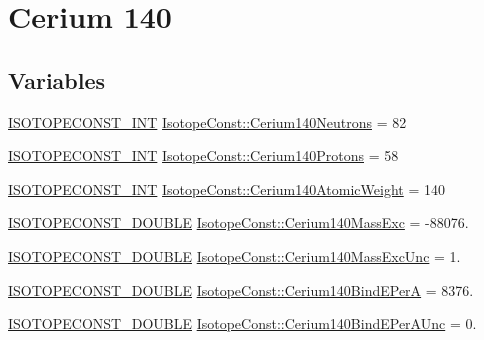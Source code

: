 \hypertarget{group___isotope_const-_cerium-_ce140}{}\section{Cerium 140}
\label{group___isotope_const-_cerium-_ce140}
\subsection*{Variables}
\begin{DoxyCompactItemize}
\item 
\mbox{\hyperlink{group___isotope_const-_macros_ga5f18360b3e99483a35c32d789e62621c}{I\+S\+O\+T\+O\+P\+E\+C\+O\+N\+S\+T\+\_\+\+I\+NT}} \mbox{\hyperlink{group___isotope_const-_cerium-_ce140_gaee6e8863ff6ec744ca0d33e7f0d38d61}{Isotope\+Const\+::\+Cerium140\+Neutrons}} = 82
\item 
\mbox{\hyperlink{group___isotope_const-_macros_ga5f18360b3e99483a35c32d789e62621c}{I\+S\+O\+T\+O\+P\+E\+C\+O\+N\+S\+T\+\_\+\+I\+NT}} \mbox{\hyperlink{group___isotope_const-_cerium-_ce140_gaabab04b80a93e19c12ee48479a5eb996}{Isotope\+Const\+::\+Cerium140\+Protons}} = 58
\item 
\mbox{\hyperlink{group___isotope_const-_macros_ga5f18360b3e99483a35c32d789e62621c}{I\+S\+O\+T\+O\+P\+E\+C\+O\+N\+S\+T\+\_\+\+I\+NT}} \mbox{\hyperlink{group___isotope_const-_cerium-_ce140_gac7c2fe4e50e41f43a75c2b8f77830f82}{Isotope\+Const\+::\+Cerium140\+Atomic\+Weight}} = 140
\item 
\mbox{\hyperlink{group___isotope_const-_macros_ga8f45a7272ce02c0b4c65c44636ed719a}{I\+S\+O\+T\+O\+P\+E\+C\+O\+N\+S\+T\+\_\+\+D\+O\+U\+B\+LE}} \mbox{\hyperlink{group___isotope_const-_cerium-_ce140_ga92ab640e69e851c6f4945b898701487a}{Isotope\+Const\+::\+Cerium140\+Mass\+Exc}} = -\/88076.
\item 
\mbox{\hyperlink{group___isotope_const-_macros_ga8f45a7272ce02c0b4c65c44636ed719a}{I\+S\+O\+T\+O\+P\+E\+C\+O\+N\+S\+T\+\_\+\+D\+O\+U\+B\+LE}} \mbox{\hyperlink{group___isotope_const-_cerium-_ce140_ga0d616694f069ec643803ba40307250ab}{Isotope\+Const\+::\+Cerium140\+Mass\+Exc\+Unc}} = 1.
\item 
\mbox{\hyperlink{group___isotope_const-_macros_ga8f45a7272ce02c0b4c65c44636ed719a}{I\+S\+O\+T\+O\+P\+E\+C\+O\+N\+S\+T\+\_\+\+D\+O\+U\+B\+LE}} \mbox{\hyperlink{group___isotope_const-_cerium-_ce140_ga6b97e43c085322d4d0a55ad85567e5c6}{Isotope\+Const\+::\+Cerium140\+Bind\+E\+PerA}} = 8376.
\item 
\mbox{\hyperlink{group___isotope_const-_macros_ga8f45a7272ce02c0b4c65c44636ed719a}{I\+S\+O\+T\+O\+P\+E\+C\+O\+N\+S\+T\+\_\+\+D\+O\+U\+B\+LE}} \mbox{\hyperlink{group___isotope_const-_cerium-_ce140_ga326dd6e59dddb66148f51da53be81ffe}{Isotope\+Const\+::\+Cerium140\+Bind\+E\+Per\+A\+Unc}} = 0.

\end{DoxyCompactItemize}
